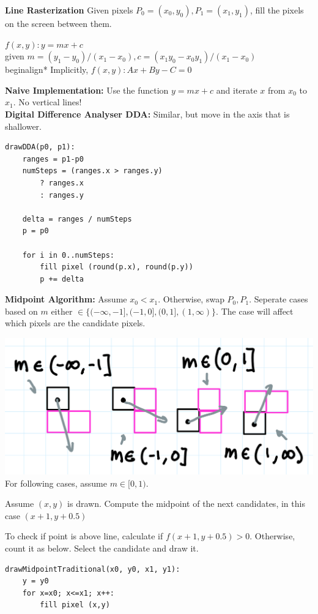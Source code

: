 \documentclass[letterpaper, 8pt]{extarticle}
\begin{document}
\begin{multicols*}{4}
\textbf{Line Rasterization}
Given pixels $P_0 = (x_0, y_0), P_1 = (x_1, y_1)$, fill the pixels on the screen between them.

$f(x, y): y = mx + c$\\given $m=(y_1 - y_0)/(x_1 - x_0), c=(x_1y_0 - x_0y_1)/(x_1 - x_0)$\\begin{align*}
Implicitly, $f(x,y): Ax + By - C = 0$

\textbf{Naive Implementation:} Use the function $y=mx+c$ and iterate $x$ from $x_0$ to $x_1$. No vertical lines!\\
\textbf{Digital Difference Analyser DDA:} Similar, but move in the axis that is shallower.

\begin{lstlisting}
drawDDA(p0, p1):
    ranges = p1-p0
    numSteps = (ranges.x > ranges.y) 
        ? ranges.x
        : ranges.y

    delta = ranges / numSteps
    p = p0

    for i in 0..numSteps:
        fill pixel (round(p.x), round(p.y))
        p += delta
\end{lstlisting}

\textbf{Midpoint Algorithm:} Assume $x_0 < x_1$. Otherwise, swap $P_0, P_1$.
Seperate cases based on $m$ either $\in \{(-\infty, -1], (-1, 0],(0, 1], (1, \infty)\}$. 
The case will affect which pixels are the candidate pixels.

\includegraphics[width=\linewidth]{rasterize-candidates.png}\\
For following cases, assume $m \in [0, 1)$.

Assume $(x, y)$ is drawn. Compute the midpoint of the next candidates, in this case $(x+1, y+0.5)$

To check if point is above line, calculate if $f(x+1, y+0.5) > 0$. Otherwise, count it as below. Select the candidate and draw it.

\begin{lstlisting} 
drawMidpointTraditional(x0, y0, x1, y1):
    y = y0
    for x=x0; x<=x1; x++:
        fill pixel (x,y)


\end{lstlisting}
\end{multicols*}
\end{document}
